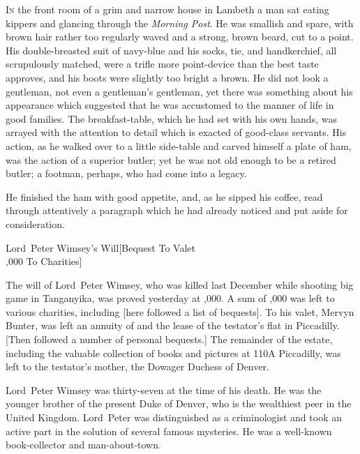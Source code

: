 
\lettrine[lines=4]{I}{n} the front room of a grim and narrow house in Lambeth a man sat eating kippers and glancing through the \textit{Morning Post}. He was smallish and spare, with brown hair rather too regularly waved and a strong, brown beard, cut to a point. His double-breasted suit of navy-blue and his socks, tie, and handkerchief, all scrupulously matched, were a trifle more point-device than the best taste approves, and his boots were slightly too bright a brown. He did not look a gentleman, not even a gentleman's gentleman, yet there was something about his appearance which suggested that he was accustomed to the manner of life in good families. The breakfast-table, which he had set with his own hands, was arrayed with the attention to detail which is exacted of good-class servants. His action, as he walked over to a little side-table and carved himself a plate of ham, was the action of a superior butler; yet he was not old enough to be a retired butler; a footman, perhaps, who had come into a legacy.

He finished the ham with good appetite, and, as he sipped his coffee, read through attentively a paragraph which he had already noticed and put aside for consideration.

\begin{newspaper}{Lord~Peter Wimsey's Will}[Bequest To Valet\\,000 To Charities]

The will of Lord~Peter Wimsey, who was killed last December while shooting big game in Tanganyika, was proved yesterday at ,000. A sum of ,000 was left to various charities, including [here followed a list of bequests]. To his valet, Mervyn Bunter, was left an annuity of  and the lease of the testator's flat in Piccadilly. [Then followed a number of personal bequests.] The remainder of the estate, including the valuable collection of books and pictures at 110A Piccadilly, was left to the testator's mother, the Dowager Duchess of Denver.

Lord~Peter Wimsey was thirty-seven at the time of his death. He was the younger brother of the present Duke of Denver, who is the wealthiest peer in the United Kingdom. Lord~Peter was distinguished as a criminologist and took an active part in the solution of several famous mysteries. He was a well-known book-collector and man-about-town.
\end{newspaper}

